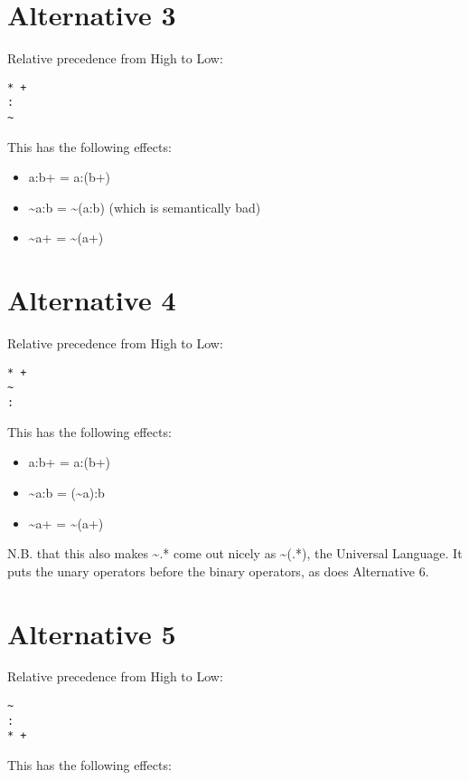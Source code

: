 \documentclass[letterpaper,12pt]{article}
\begin{document}
\section{Alternative 3}

Relative precedence from High to Low:

\begin{Verbatim}[fontsize=\small]
* +
:
~
\end{Verbatim}

\noindent
This has the following effects:

\begin{itemize}
\item
a:b+ =  a:(b+)
\item
\~{}a:b = \~{}(a:b) (which is semantically bad)
\item
\~{}a+ = \~{}(a+)
\end{itemize}

\section{Alternative 4}

Relative precedence from High to Low:

\begin{Verbatim}[fontsize=\small]
* +
~
:
\end{Verbatim}

\noindent
This has the following effects:

\begin{itemize}
\item
a:b+ =  a:(b+)
\item
\~{}a:b = (\~{}a):b
\item
\~{}a+ = \~{}(a+)
\end{itemize}

\noindent
N.B. that this also makes \~{}.* come out nicely as \~{}(.*), the
Universal Language.  It puts the unary operators before the binary
operators, as does Alternative 6.


\section{Alternative 5}

Relative precedence from High to Low:

\begin{Verbatim}[fontsize=\small]
~
:
* +
\end{Verbatim}

\noindent
This has the following effects:
\end{document}
